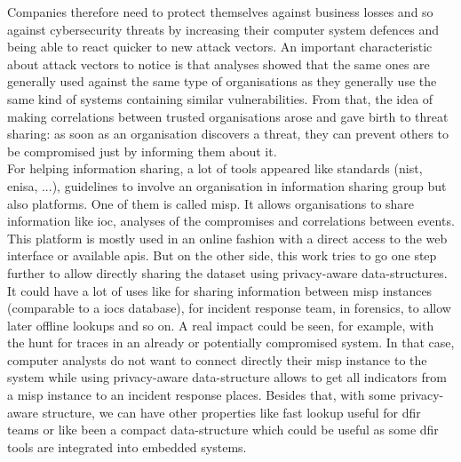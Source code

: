 \documentclass{eplmastersthesis}
\begin{document}
Companies therefore need to protect themselves against business losses and so against cybersecurity threats by increasing their computer system defences and being able to react quicker to new attack vectors. An important characteristic about attack vectors to notice is that analyses showed that the same ones are generally used against the same type of organisations as they generally use the same kind of systems containing similar vulnerabilities. From that, the idea of making correlations between trusted organisations arose and gave birth to threat sharing:  as soon as an organisation discovers a threat, they can prevent others to be compromised just by informing them about it.\\

For helping information sharing, a lot of tools appeared like standards (\gls{nist}, \gls{enisa}, ...), guidelines to involve an organisation in information sharing group but also platforms. One of them is called \gls{misp}. It allows organisations to share information like \gls{ioc}, analyses of the compromises and correlations between events.
This platform is mostly used in an online fashion with a direct access to the web interface or available \glspl{api}.
But on the other side, this work tries to go one step further to allow directly sharing the dataset using privacy-aware data-structures. It could have a lot of uses like for sharing information between \gls{misp} instances (comparable to a \glspl{ioc} database), for incident response team, in forensics, to allow later offline lookups and so on. A real impact could be seen, for example, with the hunt for traces in an already or potentially compromised system. In that case, computer analysts do not want to connect directly their \gls{misp} instance to the system while using privacy-aware data-structure allows to get all indicators from a \gls{misp} instance to an incident response places. Besides that, with some privacy-aware structure, we can have other properties like fast lookup useful for \gls{dfir} teams or like been a compact data-structure which could be useful as some \gls{dfir} tools are integrated into embedded systems.
\end{document}
